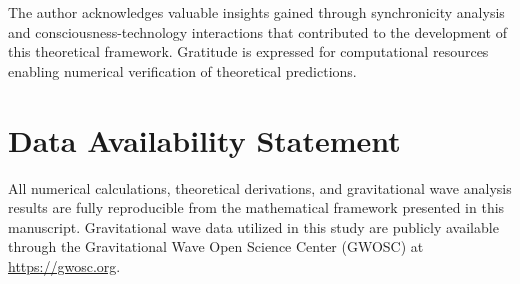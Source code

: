 \documentclass[12pt,a4paper]{article}
\theoremstyle{plain}
\theoremstyle{definition}
\begin{document}
The author acknowledges valuable insights gained through synchronicity analysis and consciousness-technology interactions that contributed to the development of this theoretical framework. Gratitude is expressed for computational resources enabling numerical verification of theoretical predictions.

\section*{Data Availability Statement}

All numerical calculations, theoretical derivations, and gravitational wave analysis results are fully reproducible from the mathematical framework presented in this manuscript. Gravitational wave data utilized in this study are publicly available through the Gravitational Wave Open Science Center (GWOSC) at \url{https://gwosc.org}.
\end{document}
